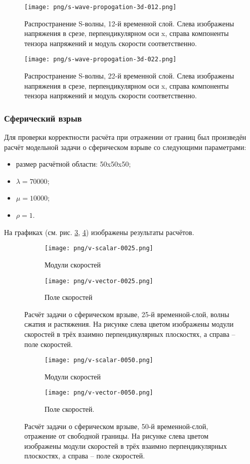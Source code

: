 \begin{figure}[htp]
\centering
\texttt{[image: png/s-wave-propogation-3d-012.png]}
\caption{Распространение S-волны, 12-й временной слой. Слева изображены
напряжения в срезе, перпендикулярном оси x, справа компоненты тензора напряжений
и модуль скорости соответственно.}
\label{pic:s_wave_12}
\end{figure}
\begin{figure}[htp]
\centering
\texttt{[image: png/s-wave-propogation-3d-022.png]}
\caption{Распространение S-волны, 22-й временной слой. Слева изображены
напряжения в срезе, перпендикулярном оси x, справа компоненты тензора напряжений
и модуль скорости соответственно.}
\label{pic:s_wave_22}
\end{figure}
\subsubsection{Сферический взрыв}
Для проверки корректности расчёта при отражении от границ был произведён расчёт
модельной задачи о сферическом взрыве со следующими параметрами:
\begin{itemize}
\item размер расчётной области: 50x50x50;
\item $\lambda=70000$;
\item $\mu=10000$;
\item $\rho=1$.
\end{itemize}
На графиках (см. рис. \ref{pic:spherical_25}, \ref{pic:spherical_50}) изображены
результаты расчётов.
\begin{figure}[htp]
\begin{subfigure}[b]{0.5\textwidth}
\centering
\texttt{[image: png/v-scalar-0025.png]}
\caption{Модули скоростей}
\end{subfigure}
\begin{subfigure}[b]{0.5\textwidth}
\centering
\texttt{[image: png/v-vector-0025.png]}
\caption{Поле скоростей}
\end{subfigure}
\caption{Расчёт задачи о сферическом врзыве, 25-й временной-слой, волны сжатия и
растяжения. На рисунке слева цветом изображены модули скоростей в трёх взаимно
перпендикулярных плоскостях, а справа -- поле скоростей.}
\label{pic:spherical_25}
\end{figure}
\begin{figure}[htp]
\begin{subfigure}[b]{0.5\textwidth}
\centering
\texttt{[image: png/v-scalar-0050.png]}
\caption{Модули скоростей}
\end{subfigure}
\begin{subfigure}[b]{0.5\textwidth}
\centering
\texttt{[image: png/v-vector-0050.png]}
\caption{Поле скоростей.}
\end{subfigure}
\caption{Расчёт задачи о сферическом врзыве, 50-й временной-слой, отражение от
свободной границы. На рисунке слева цветом изображены модули скоростей в трёх взаимно
перпендикулярных плоскостях, а справа -- поле скоростей.}
\label{pic:spherical_50}
\end{figure}
\clearpage
